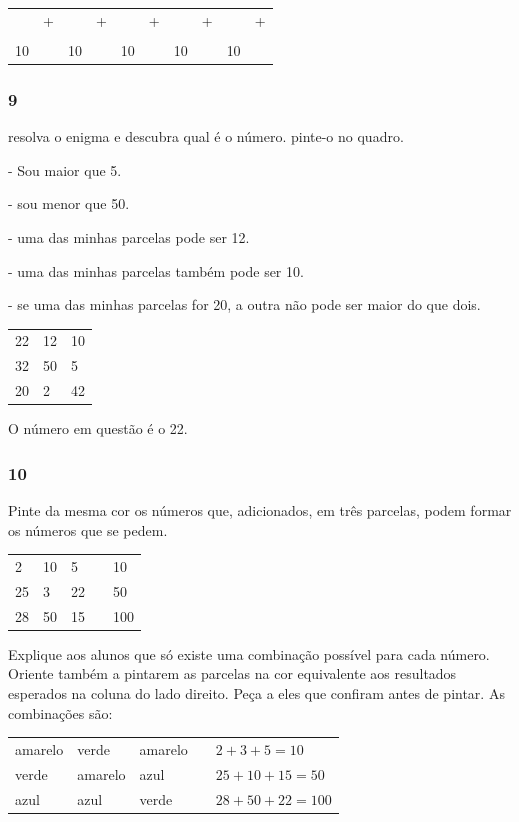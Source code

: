 \begin{longtable}[]{@{}llllllllll@{}}
\toprule
& + & & + & & + & & + & & +\tabularnewline
& & & & & & & & &\tabularnewline
10 & & 10 & & 10 & & 10 & & 10 &\tabularnewline
\bottomrule
\end{longtable}


\subsubsection{9}\label{section-16}

resolva o enigma e descubra qual é o número. pinte-o no quadro.

- Sou maior que 5.

- sou menor que 50.

- uma das minhas parcelas pode ser 12.

- uma das minhas parcelas também pode ser 10.

- se uma das minhas parcelas for 20, a outra não pode ser maior do que
dois.

\begin{longtable}[]{@{}lll@{}}
\toprule
22 & 12 & 10\tabularnewline
32 & 50 & 5\tabularnewline
20 & 2 & 42\tabularnewline
\bottomrule
\end{longtable}

O número em questão é o 22.

\subsubsection{10}\label{section-17}

Pinte da mesma cor os números que, adicionados, em três parcelas, podem
formar os números que se pedem.

\begin{longtable}[]{@{}lllll@{}}
\toprule
2 & 10 & 5 & & 10\tabularnewline
25 & 3 & 22 & & 50\tabularnewline
28 & 50 & 15 & & 100\tabularnewline
\bottomrule
\end{longtable}

Explique aos alunos que só existe uma combinação possível
para cada número. Oriente também a pintarem as parcelas na cor
equivalente aos resultados esperados na coluna do lado direito. Peça
a eles que confiram antes de pintar. As combinações são:

\begin{longtable}[]{@{}lllll@{}}
\toprule
amarelo & verde & amarelo & & \(2 + 3 + 5 = 10\)\tabularnewline
verde & amarelo & azul & & \(25 + 10 + 15 = 50\)\tabularnewline
azul & azul & verde & & \(28 + 50 + 22 = 100\)\tabularnewline
\bottomrule
\end{longtable}

